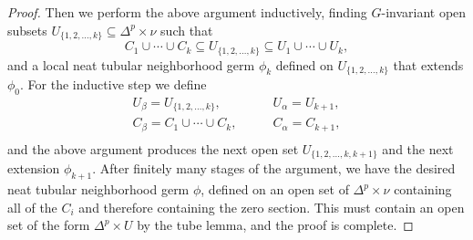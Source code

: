 \documentclass[11pt]{amsart}
\theoremstyle{definition}
\numberwithin{equation}{section}
\numberwithin{figure}{section}
\newcommand{\NTub}{\textup{NTub}}
\newcommand{\sbt}{\,\begin{picture}(-1,1)(0.5,-1)\circle*{1.8}\end{picture}\hspace{.05cm}}
\begin{document}
\begin{proof}
	Then we perform the above argument inductively, finding $G$-invariant open subsets $U_{\{1,2,\ldots,k\}} \subseteq \Delta^p \times \nu$ such that
	\[ C_1 \cup \cdots \cup C_k \subseteq U_{\{1,2,\ldots,k\}} \subseteq U_1 \cup \cdots \cup U_k, \]
	and a local neat tubular neighborhood germ $\phi_k$ defined on $U_{\{1,2,\ldots,k\}}$ that extends $\phi_0$. For the inductive step we define
	\begin{align*}
		U_\beta = U_{\{1,2,\ldots,k\}}, & \qquad U_\alpha = U_{k+1}, \\
		C_\beta = C_1 \cup \cdots \cup C_k, & \qquad C_\alpha = C_{k+1}, \\
	\end{align*}
	and the above argument produces the next open set $U_{\{1,2,\ldots,k,k+1\}}$ and the next extension $\phi_{k+1}$. After finitely many stages of the argument, we have the desired neat tubular neighborhood germ $\phi$, defined on an open set of $\Delta^p \times \nu$ containing all of the $C_i$ and therefore containing the zero section. This must contain an open set of the form $\Delta^p \times U$ by the tube lemma, and the proof is complete.
%
%
%

\end{proof}
\end{document}
